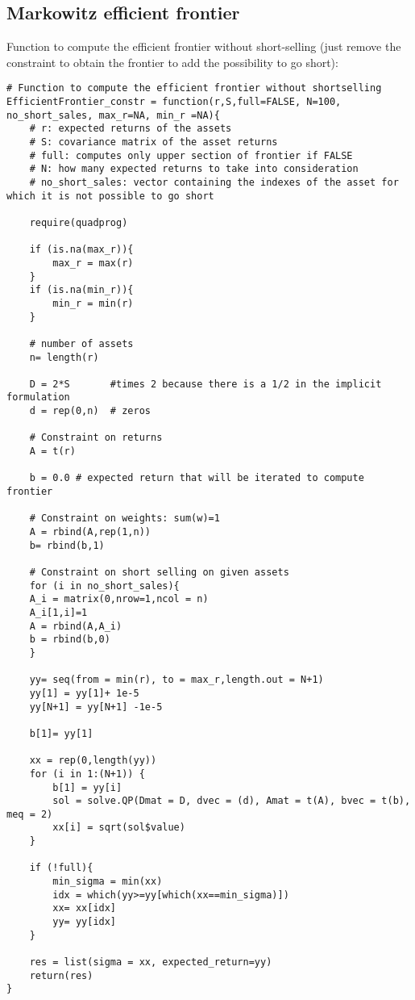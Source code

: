 \subsection{Markowitz efficient frontier}


\noindent
Function to compute the efficient frontier without short-selling (just remove the constraint to obtain the frontier to add the possibility to go short):

\begin{lstlisting}
# Function to compute the efficient frontier without shortselling
EfficientFrontier_constr = function(r,S,full=FALSE, N=100, no_short_sales, max_r=NA, min_r =NA){
	# r: expected returns of the assets
	# S: covariance matrix of the asset returns
	# full: computes only upper section of frontier if FALSE
	# N: how many expected returns to take into consideration
	# no_short_sales: vector containing the indexes of the asset for which it is not possible to go short
	
	require(quadprog)
	
	if (is.na(max_r)){
		max_r = max(r)
	}
	if (is.na(min_r)){
		min_r = min(r)
	}
	
	# number of assets
	n= length(r)
	
	D = 2*S       #times 2 because there is a 1/2 in the implicit formulation
	d = rep(0,n)  # zeros
	
	# Constraint on returns
	A = t(r)
	
	b = 0.0 # expected return that will be iterated to compute frontier
	
	# Constraint on weights: sum(w)=1
	A = rbind(A,rep(1,n))
	b= rbind(b,1)
	
	# Constraint on short selling on given assets
	for (i in no_short_sales){
	A_i = matrix(0,nrow=1,ncol = n)
	A_i[1,i]=1
	A = rbind(A,A_i)
	b = rbind(b,0)
	}
	
	yy= seq(from = min(r), to = max_r,length.out = N+1)
	yy[1] = yy[1]+ 1e-5
	yy[N+1] = yy[N+1] -1e-5
	
	b[1]= yy[1]
	
	xx = rep(0,length(yy))
	for (i in 1:(N+1)) {
		b[1] = yy[i]
		sol = solve.QP(Dmat = D, dvec = (d), Amat = t(A), bvec = t(b), meq = 2)
		xx[i] = sqrt(sol$value)
	}
	
	if (!full){
		min_sigma = min(xx)
		idx = which(yy>=yy[which(xx==min_sigma)])
		xx= xx[idx]
		yy= yy[idx]
	}
	
	res = list(sigma = xx, expected_return=yy)
	return(res)
}
\end{lstlisting}

